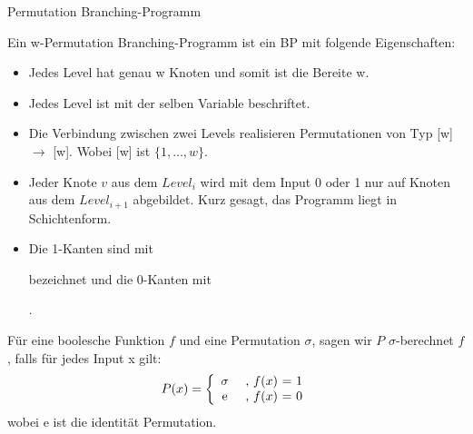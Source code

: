 \documentclass{beamer}
\begin{document}
\begin{frame}{Permutation Branching-Programm}

Ein w-Permutation Branching-Programm ist ein BP mit folgende Eigenschaften:
\begin{itemize}
\item Jedes Level hat genau w Knoten und somit ist die Bereite w.
\item Jedes Level ist mit der selben Variable beschriftet.
\item Die Verbindung zwischen zwei Levels realisieren Permutationen von Typ [w] $\rightarrow$ [w]. Wobei [w] ist $\{1,\dots,w\}$.
\item Jeder Knote $v$ aus dem $Level_i$ wird mit dem Input 0 oder 1 nur auf Knoten aus dem $Level_{i+1}$ abgebildet. Kurz gesagt, das Programm liegt in Schichtenform.
\item Die 1-Kanten sind mit
bezeichnet und die 0-Kanten mit 
.  
\end{itemize}
Für eine boolesche Funktion $f$ und eine Permutation $\sigma$, sagen wir $P$ $\sigma$-berechnet $f$, falls für jedes Input x gilt: 
\[ P(x) = \left\{\begin{array}{cl} \sigma & \mbox{  , $f(x)$ = 1} \\ $e$ & \mbox{  , $f(x)$ = 0}\end{array} \right. \]
wobei e ist die identität Permutation.
\end{frame}
\end{document}

